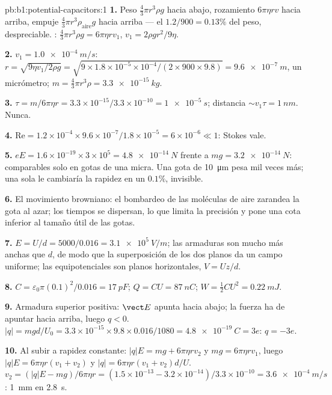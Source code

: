 \begin{solution}{pb:b1:potential-capacitors:1}
\textbf{1.} Peso $\tfrac43\pi r^3\rho g$ hacia abajo, rozamiento $6\pi\eta rv$ hacia arriba,
empuje $\tfrac43\pi r^3\rho_{\text{aire}}g$ hacia arriba --- el $1.2/900 = 0.13\%$ del
peso, despreciable. : $\tfrac43\pi r^3\rho g = 6\pi\eta rv_1$, $v_1 =
2\rho gr^2/9\eta$.

\textbf{2.} $v_1 = \qty{1.0e-4}{m/s}$: $r = \sqrt{9\eta v_1/2\rho g} = \sqrt{9 \times
1.8 \times 10^{-5} \times 10^{-4}/(2 \times 900 \times 9.8)} = \qty{9.6e-7}{m}$, un
micrómetro; $m = \tfrac43\pi r^3\rho = \qty{3.3e-15}{kg}$.

\textbf{3.} $\tau = m/6\pi\eta r = 3.3 \times 10^{-15}/3.3 \times 10^{-10} = \qty{1e-5}{s}$;
distancia $\sim v_1\tau = \qty{1}{nm}$. Nunca.

\textbf{4.} $\mathrm{Re} = 1.2 \times 10^{-4} \times 9.6 \times 10^{-7}/1.8 \times 10^{-5} =
6 \times 10^{-6} \ll 1$: Stokes vale.

\textbf{5.} $eE = 1.6 \times 10^{-19} \times 3 \times 10^5 = \qty{4.8e-14}{N}$ frente a
$mg = \qty{3.2e-14}{N}$: comparables solo en gotas de una micra. Una gota de \qty{10}{\micro m}
pesa mil veces más; una sola  le cambiaría
la rapidez en un $0.1\%$, invisible.

\textbf{6.} El movimiento browniano: el bombardeo de las moléculas de
aire zarandea la gota al azar; los tiempos se dispersan, lo que limita la
precisión y pone una cota inferior al tamaño útil de las gotas.

\textbf{7.} $E = U/d = 5000/0.016 = \qty{3.1e5}{V/m}$; las armaduras son mucho más anchas que
$d$, de modo que la superposición de los dos planos da un campo uniforme;
las equipotenciales son planos horizontales, $V = Uz/d$.

\textbf{8.} $C = \varepsilon_0\pi(0.1)^2/0.016 = \qty{17}{pF}$; $Q = CU = \qty{87}{nC}$;
$W = \tfrac12CU^2 = \qty{0.22}{mJ}$.

\textbf{9.} Armadura superior positiva: $\vect E$ apunta hacia abajo; la
fuerza ha de apuntar hacia arriba, luego $q < 0$. $|q| = mgd/U_0 = 3.3 \times 10^{-15} \times 9.8 \times 0.016/
1080 = \qty{4.8e-19}{C} = 3e$: $q = -3e$.

\textbf{10.} Al subir a rapidez constante: $|q|E = mg + 6\pi\eta rv_2$ y $mg =
6\pi\eta rv_1$, luego $|q|E = 6\pi\eta r(v_1 + v_2)$ y $|q| = 6\pi\eta r(v_1 +
v_2)d/U$. $v_2 = (|q|E - mg)/6\pi\eta r = (1.5 \times 10^{-13} - 3.2 \times 10^{-14})/
3.3 \times 10^{-10} = \qty{3.6e-4}{m/s}$: \qty{1}{mm} en \qty{2.8}{s}.


\end{solution}

